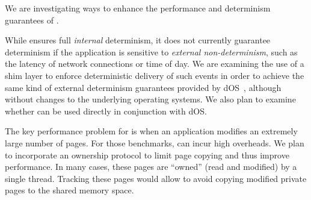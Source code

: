 \label{sec:future-work}

We are investigating ways to enhance the performance and determinism
guarantees of \dthreads{}.

While \dthreads{} ensures full \emph{internal} determinism, it does
not currently guarantee determinism if the application is sensitive
to \emph{external non-determinism}, such as the latency of network
connections or time of day. We are examining the use of a shim layer
to enforce deterministic delivery of such events in order to achieve
the same kind of external determinism guarantees provided by
dOS~\cite{deterministic-process-groups}, although without changes to
the underlying operating systems. We also plan to examine
whether \dthreads{} can be used directly in conjunction with dOS.

The key performance problem for \dthreads{} is when an application
modifies an extremely large number of pages. For those
benchmarks, \dthreads{} can incur high overheads. We plan to
incorporate an ownership protocol to limit page copying and thus
improve performance. In many cases, these pages are ``owned'' (read
and modified) by a single thread. Tracking these pages would
allow \dthreads{} to avoid copying modified private pages to the
shared memory space.

